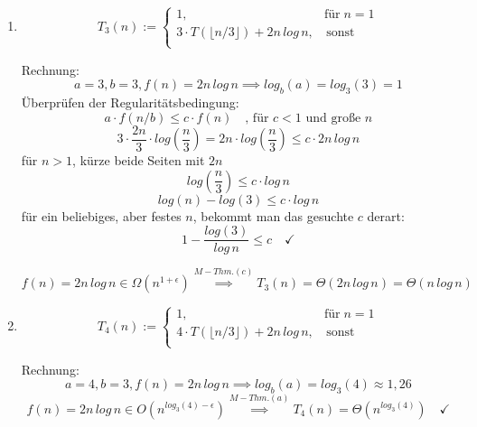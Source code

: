 \documentclass[ngerman,landscape,twocolumn]{adtexsheet}
\begin{document}
\begin{question}
\begin{enumerate}
\begin{enumerate}
            \newpage
                \item
            $$T_3(n) := \left\{
                \begin{array}{ll}
                    1, &  \textrm{für} \; n = 1 \\
                    3\cdot T(\lfloor n/3 \rfloor) + 2n\,log\,n,  & \, \textrm{sonst} \\
                \end{array}
            \right. $$
            
            Rechnung:
            \[
            a=3, b=3, f(n)=2n\,log\,n \implies log_b(a) = log_3(3) = 1
            \]
            Überprüfen der Regularitätsbedingung:
            \[
            a\cdot f(n/b) \leq c \cdot f(n) \quad \textrm{, für $c < 1$ und große $n$}
            \]
            \[
            3 \cdot \frac{2n}{3} \cdot log(\frac{n}{3}) = 2n \cdot log(\frac{n}{3}) \leq c \cdot 2n\, log\,n 
            \]
            für $n>1$, kürze beide Seiten mit $2n$
            \[
            log(\frac{n}{3}) \leq c \cdot log\,n
            \]
            \[
            log(n)-log(3) \leq c \cdot log\,n
            \]
            für ein beliebiges, aber festes $n$, bekommt man das gesuchte $c$ derart: 
            \[
            1 - \frac{log(3)}{log\, n} \leq c \quad \checkmark
            \]
            
            \[
            f(n)=2n\,log\,n \in \Omega(n^{1+\epsilon}) \stackrel{M-Thm. (c)}{\implies} T_3(n) = \Theta(2n\,log\,n) = \Theta(n\,log\,n) \quad
            \]
                \item
            $$T_4(n) := \left\{
                \begin{array}{ll}
                    1, &  \textrm{für} \; n = 1 \\
                    4 \cdot T(\lfloor n/3 \rfloor) + 2n\,log\,n,  & \, \textrm{sonst} \\
                \end{array}
            \right. $$
            
            Rechnung:
            \[
            a=4, b=3, f(n)=2n\,log\,n \implies log_b(a) = log_3(4) \approx 1,26
            \]
            \[
            f(n)=2n\,log\,n \in O(n^{log_3(4)-\epsilon}) \stackrel{M-Thm. (a)}{\implies} T_4(n) = \Theta(n^{log_3(4)}) \quad \checkmark
            \]
            \end{enumerate}
            
            \newpage
            

\end{enumerate}
\end{question}
\end{document}
